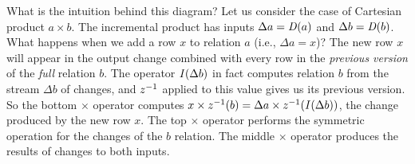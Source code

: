 What is the intuition behind this diagram?  Let us consider the case
of Cartesian product $a \times b$.  The incremental product has inputs
$\Delta a = \mathit{D}(a)$ and $\Delta b = \mathit{D}(b)$.  What happens when we add a
row $x$ to relation $a$ (i.e., $\Delta a = x$)?  The new row $x$ will
appear in the output change combined with every row in the
\emph{previous version} of the \emph{full} relation $b$.  The operator
$\mathit{I}(\Delta b)$ in fact computes relation $b$ from the stream $\Delta
b$ of changes, and $z^{-1}$ applied to this value gives us its previous
version.  So the bottom $\times$ operator computes $x \times z^{-1}(b) =
\Delta a \times z^{-1}(\mathit{I}(\Delta b))$, the change produced by the new row
$x$.  The top $\times$ operator performs the symmetric operation for
the changes of the $b$ relation.  The middle $\times$ operator
produces the results of changes to both inputs.

%
